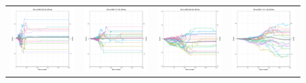 \begin{figure}
\centering
\begin{tabular}{cccc}
\hspace{-0.5cm}\includegraphics[width = 1.55in]{images/Visualizations/GAvsANN/500ms5x5.png} &
\hspace{-0.5cm}\includegraphics[width = 1.55in]{images/Visualizations/GAvsANN/500ms7x7.png} &
\hspace{-0.5cm}\includegraphics[width = 1.55in]{images/Visualizations/GAvsANN/500ms9x9.png} &
\hspace{-0.5cm}\includegraphics[width = 1.55in]{images/Visualizations/GAvsANN/500ms11x11.png} \\


\end{tabular}
\end{figure}
